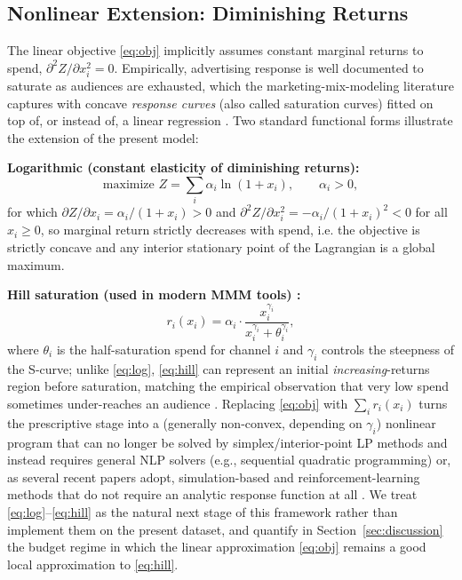 \documentclass[conference]{IEEEtran}
\begin{document}
\subsection{Nonlinear Extension: Diminishing Returns}
\label{sec:nlp}
The linear objective \eqref{eq:obj} implicitly assumes constant marginal returns to spend, $\partial^2 Z/\partial x_i^2 = 0$. Empirically, advertising response is well documented to saturate as audiences are exhausted, which the marketing-mix-modeling literature captures with concave \emph{response curves} (also called saturation curves) fitted on top of, or instead of, a linear regression \cite{mmm_diminishing_returns,mmm_saturation_curves,mmm_hill_pymc,mmm_adstock}. Two standard functional forms illustrate the extension of the present model:

\textbf{Logarithmic (constant elasticity of diminishing returns):}
\begin{equation}
\text{maximize } Z = \sum_{i} \alpha_i \ln(1+x_i), \qquad \alpha_i>0,
\label{eq:log}
\end{equation}
for which $\partial Z/\partial x_i = \alpha_i/(1+x_i) > 0$ and $\partial^2 Z/\partial x_i^2 = -\alpha_i/(1+x_i)^2 < 0$ for all $x_i \ge 0$, so marginal return strictly decreases with spend, i.e. the objective is strictly concave and any interior stationary point of the Lagrangian is a global maximum.

\textbf{Hill saturation (used in modern MMM tools) \cite{mmm_hill_pymc}:}
\begin{equation}
r_i(x_i) = \alpha_i \cdot \frac{x_i^{\gamma_i}}{x_i^{\gamma_i} + \theta_i^{\gamma_i}},
\label{eq:hill}
\end{equation}
where $\theta_i$ is the half-saturation spend for channel $i$ and $\gamma_i$ controls the steepness of the S-curve; unlike \eqref{eq:log}, \eqref{eq:hill} can represent an initial \emph{increasing}-returns region before saturation, matching the empirical observation that very low spend sometimes under-reaches an audience \cite{mmm_diminishing_returns}. Replacing \eqref{eq:obj} with $\sum_i r_i(x_i)$ turns the prescriptive stage into a (generally non-convex, depending on $\gamma_i$) nonlinear program that can no longer be solved by simplex/interior-point LP methods and instead requires general NLP solvers (e.g., sequential quadratic programming) or, as several recent papers adopt, simulation-based and reinforcement-learning methods that do not require an analytic response function at all \cite{danaei_2026,li_ieee_access_2024,bora_2022}. We treat \eqref{eq:log}--\eqref{eq:hill} as the natural next stage of this framework rather than implement them on the present dataset, and quantify in Section~\ref{sec:discussion} the budget regime in which the linear approximation \eqref{eq:obj} remains a good local approximation to \eqref{eq:hill}.
\end{document}

